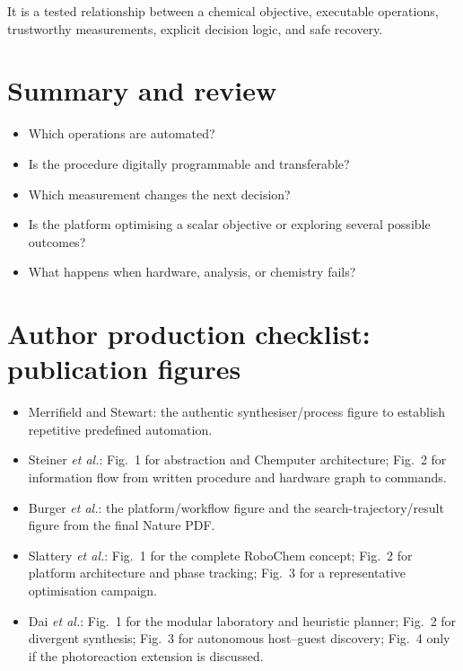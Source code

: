 \begin{insightbox}
  It is a tested relationship between a chemical objective, executable operations, trustworthy measurements, explicit decision logic, and safe recovery.
\end{insightbox}

\section{Summary and review}

\begin{itemize}
  \item Which operations are automated?
  \item Is the procedure digitally programmable and transferable?
  \item Which measurement changes the next decision?
  \item Is the platform optimising a scalar objective or exploring several possible outcomes?
  \item What happens when hardware, analysis, or chemistry fails?
\end{itemize}

\section*{Author production checklist: publication figures}

\begin{itemize}
  \item Merrifield and Stewart: the authentic synthesiser/process figure to establish repetitive predefined automation.
  \item Steiner \textit{et al.}: Fig.~1 for abstraction and Chemputer architecture; Fig.~2 for information flow from written procedure and hardware graph to commands.
  \item Burger \textit{et al.}: the platform/workflow figure and the search-trajectory/result figure from the final Nature PDF.
  \item Slattery \textit{et al.}: Fig.~1 for the complete RoboChem concept; Fig.~2 for platform architecture and phase tracking; Fig.~3 for a representative optimisation campaign.
  \item Dai \textit{et al.}: Fig.~1 for the modular laboratory and heuristic planner; Fig.~2 for divergent synthesis; Fig.~3 for autonomous host--guest discovery; Fig.~4 only if the photoreaction extension is discussed.
\end{itemize}

